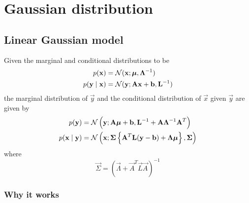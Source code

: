 \section{Gaussian distribution}
\subsection{Linear Gaussian model}
\label{ssec:prob-gaussian-lingauss}
Given the marginal and conditional distributions to be
\begin{align}
    p(\vec x)               &= \Gauss(\vec x; \vec \mu, \vec \Lambda^{-1}) \label{eqn:prob-gaussian-lingauss1} \\
    p(\vec y \mid \vec x)   &= \Gauss(\vec y; \vec A \vec x + \vec b, \vec L^{-1}) \label{eqn:prob-gaussian-lingauss2}
\end{align}
the marginal distribution of $\vec y$ and the conditional distribution of $\vec x$ given $\vec y$ are given by
\begin{align}
    p(\vec y)               &= \Gauss\left(\vec y; \vec A \vec \mu + \vec b, \vec L^{-1} + \vec A \vec \Lambda^{-1} \vec A^T\right) \label{eqn:prob-gaussian-lingauss3}\\
    p(\vec x \mid \vec y)   &= \Gauss\left(\vec x; \vec \Sigma\left\{\vec A^T \vec L(\vec y - \vec b) + \vec \Lambda \vec \mu\right\}, \vec \Sigma\right) \label{eqn:prob-gaussian-lingauss4}
\end{align}
where
\begin{equation}
    \vec \Sigma = \left(\vec \Lambda + \vec A^T \vec L \vec A \right)^{-1} \label{eqn:prob-gaussian-lingauss5}
\end{equation}

\subsubsection{Why it works}